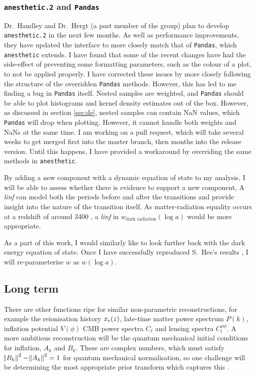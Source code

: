 \documentclass{article}
\begin{document}
\subsubsection{\texttt{anesthetic.2} and \texttt{Pandas}}

Dr.~Handley and Dr.~Hergt (a past member of the group) plan to develop \texttt{anesthetic.2} in the next few months. As well as performance improvements, they have updated the interface to more closely match that of \texttt{Pandas}, which \texttt{anesthetic} extends. I have found that some of the recent changes have had the side-effect of preventing some formatting parameters, such as the colour of a plot, to not be applied properly. I have corrected these issues by more closely following the structure of the overridden \texttt{Pandas} methods. However, this has led to me finding a bug in \texttt{Pandas} itself. Nested samples are weighted, and \texttt{Pandas} should be able to plot histograms and kernel density estimates out of the box. However, as discussed in section \ref{sec:de}, nested samples can contain NaN values, which \texttt{Pandas} will drop when plotting. However, it cannot handle both weights and NaNs at the same time. I am working on a pull request, which will take several weeks to get merged first into the master branch, then months into the release version. Until this happens, I have provided a workaround by overriding the same methods in \texttt{anesthetic}.

By adding a new component with a dynamic equation of state to my analysis, I will be able to assess whether there is evidence to support a new component, 
A \textit{linf} can model both the periods before and after the transitions and provide insight into the nature of the transition itself. As matter-radiation equality occurs at a redshift of around 3400 \cite{planck_6}, a \textit{linf} in $w_\textrm{dark radiation}(\log{a})$ would be more appropriate. 


As a part of this work, I would similarly like to look further back with the dark energy equation of state. Once I have successfully reproduced S.~Hee's results \cite{Sonke}, I will re-parameterise $w$ as $w(\log{a})$.

\subsection{Long term}

There are other functions ripe for similar non-parametric reconstructions, for example the reionisation history $x_\textrm e(z)$, late-time matter power spectrum $P(k)$, inflation potential $V(\phi)$ CMB power spectra $C_\ell$ and lensing spectra $C_l^{\phi\phi}$. A more ambitious reconstruction will be the quantum mechanical initial conditions for inflation, $A_k$ and $B_k$. These are complex numbers, which must satisfy $\norm{B_k}^2-\norm{A_k}^2=1$ for quantum mechanical normalisation, so one challenge will be determining the most appropriate prior transform which captures this \cite{shumaylov2022}.
\end{document}
